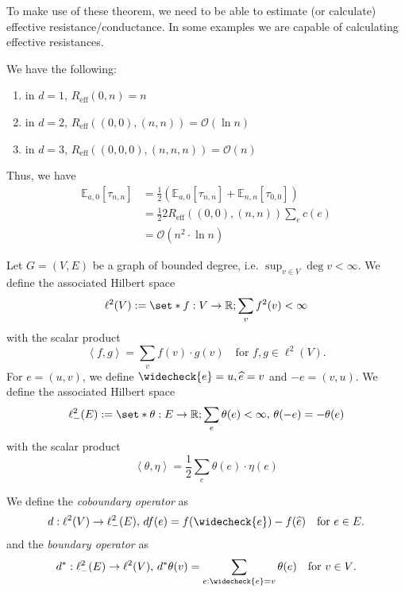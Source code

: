 To make use of these theorem, we need to be able to estimate (or calculate) effective resistance/conductance. In some examples we are capable of calculating effective resistances.

\begin{fact}
    We have the following: 
    \begin{enumerate}[1)]
      \item in $d=1$, \(R_{\mathrm{eff}}(0,n)=n\)
    \item in $d=2$, \(R_{\mathrm{eff}} \left((0,0),(n,n)\right)=\mathcal{O}(\ln n)\)
    \item in $d=3$, \(R_{\mathrm{eff}} \left((0,0,0),(n,n,n)\right)=\mathcal{O}(n) \)
    \end{enumerate}
Thus, we have 
\begin{align*}
  \mathbb{E}_{a,0}[\tau_{n,n}] &= \frac{1}{2} \left(\mathbb{E}_{a,0}[\tau_{n,n}]+ \mathbb{E}_{n,n}[\tau_{0,0}]\right) \\
                               &=\frac{1}{2} 2 R_{\mathrm{eff}} \left((0,0),(n,n)\right) \sum_e c(e) \\
                               &=\mathcal{O}(n^2 \cdot \ln n)
\end{align*} 

\end{fact}


\begin{defn}
    Let \(G=(V,E)\) be a graph of bounded degree, i.e. \(\sup_{v\in V} \operatorname{deg}v<\infty \). We define the associated Hilbert space 
    \[\ell^2(V) := \set*{f: V \to \mathbb{R}; \sum_v f^2(v) < \infty }\]
with the scalar product 
\[\left\langle f, g \right\rangle =  \sum_v f(v)\cdot g(v) \quad \text{for \(f,g \in \ell^2(V).\)}\]
For \(e=(u,v)\), we define \(\widecheck{e}=u, \widehat{e}=v\) and \(-e=(v,u)\). We define the associated Hilbert space 
\[\ell^2_{-}(E):= \set*{\theta: E \to \mathbb{R}; \sum_e \theta(e)< \infty,\, \theta(-e)=-\theta(e) }\]
with the scalar product
\[ \left\langle \theta, \eta \right\rangle = \frac{1}{2} \sum_e \theta(e) \cdot \eta(e)\]

\end{defn}

\begin{defn}
We define the \emph{coboundary operator} as 
\[d: \ell^2(V) \to \ell^2_{-}(E),\, df(e)=f(\widecheck{e})-f(\widehat{e}) \quad\text{for \(e\in E\).}\]
and the \emph{boundary operator} as 
\[d^*: \ell^2_{-}(E) \to \ell^2(V),\, d^*\theta(v)=\sum_{e: \widecheck{e}=v} \theta(e) \quad\text{for \(v\in V\).} \]
   

\end{defn}

